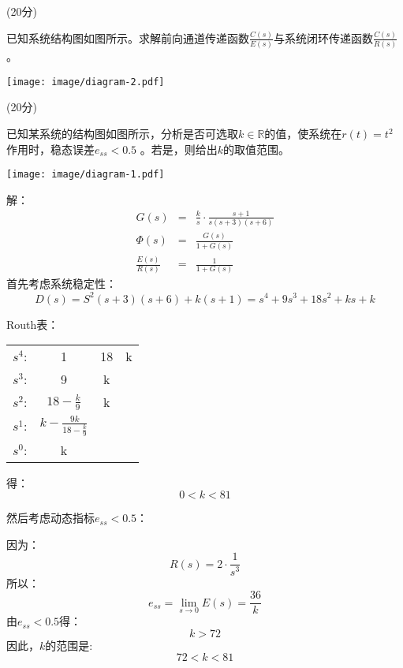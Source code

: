 
\question(20分) {已知系统结构图如图所示。求解前向通道传递函数{\Large $\frac{C(s)}{E(s)}$}与系统闭环传递函数{\Large $\frac{C(s)}{R(s)}$}。
	
	\texttt{[image: image/diagram-2.pdf]}
	
}


\onlytest{\vskip 3em}

\onlytest{\newpage}

\question(20分){已知某系统的结构图如图所示，分析是否可选取$k\in\mathbb{R}$的值，使系统在$r(t)=t^2$作用时，稳态误差$e_{ss}<0.5$ 。若是，则给出$k$的取值范围。

\texttt{[image: image/diagram-1.pdf]}

\onlyanswer
{
解：\\
\begin{eqnarray}
G(s) &=& \frac{k}{s}\cdot\frac{s+1}{s(s+3)(s+6)}\\
\Phi(s)&=&\frac{G(s)}{1+G(s)}\\
\frac{E(s)}{R(s)}&=&\frac{1}{1+G(s)}
\end{eqnarray}
首先考虑系统稳定性：
$$D(s)=S^2(s+3)(s+6)+k(s+1)=s^4+9s^3+18s^2+ks+k$$

Routh表：

\begin{tabular}{cccc}
	$s^4$: & 1 & 18 & k \\
	$s^3$: & 9 & k &\\
	$s^2$: & $18-\frac{k}{9}$ & k &\\
	$s^1$: & $k-\frac{9k}{18-\frac{k}{9}}$ & &\\
	$s^0$: & k & &
\end{tabular}

得：$$0<k<81$$

然后考虑动态指标$e_{ss}<0.5$：

因为：
$$R(s)=2\cdot\frac{1}{s^3}$$
所以：
$$e_{ss}=\lim_{s\rightarrow 0}{E(s)}=\frac{36}{k}$$
由$e_{ss}<0.5$得：
$$k>72$$
因此，$k$的范围是:
$$72<k<81$$
}
}


